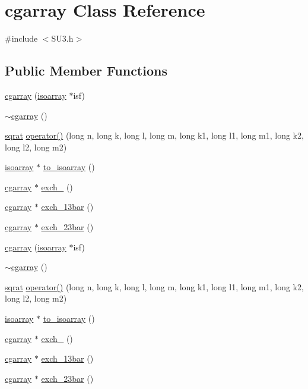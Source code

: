 \hypertarget{classcgarray}{}\section{cgarray Class Reference}
\label{classcgarray}


{\ttfamily \#include $<$S\+U3.\+h$>$}

\subsection*{Public Member Functions}
\begin{DoxyCompactItemize}
\item 
\mbox{\hyperlink{classcgarray_a0a9d804cf3256428f8d8937749a8b776}{cgarray}} (\mbox{\hyperlink{classisoarray}{isoarray}} $\ast$isf)
\item 
\mbox{\hyperlink{classcgarray_af332defc2438028410ad8e2ae98aa848}{$\sim$cgarray}} ()
\item 
\mbox{\hyperlink{classsqrat}{sqrat}} \mbox{\hyperlink{classcgarray_ad55c1e537d3070a732d9355ed351d53e}{operator()}} (long n, long k, long l, long m, long k1, long l1, long m1, long k2, long l2, long m2)
\item 
\mbox{\hyperlink{classisoarray}{isoarray}} $\ast$ \mbox{\hyperlink{classcgarray_af65861dda6c89fcaed8b73a40dfe88a6}{to\+\_\+isoarray}} ()
\item 
\mbox{\hyperlink{classcgarray}{cgarray}} $\ast$ \mbox{\hyperlink{classcgarray_a59212ed070a6ebdc199063d7c7eaee50}{exch\+\_}} ()
\item 
\mbox{\hyperlink{classcgarray}{cgarray}} $\ast$ \mbox{\hyperlink{classcgarray_a961a09e4792a1e3b9b9c7ac10f02bc1b}{exch\+\_\+13bar}} ()
\item 
\mbox{\hyperlink{classcgarray}{cgarray}} $\ast$ \mbox{\hyperlink{classcgarray_af5c8cdf36d5e417b29162ca27805fc1b}{exch\+\_\+23bar}} ()
\item 
\mbox{\hyperlink{classcgarray_a0a9d804cf3256428f8d8937749a8b776}{cgarray}} (\mbox{\hyperlink{classisoarray}{isoarray}} $\ast$isf)
\item 
\mbox{\hyperlink{classcgarray_af332defc2438028410ad8e2ae98aa848}{$\sim$cgarray}} ()
\item 
\mbox{\hyperlink{classsqrat}{sqrat}} \mbox{\hyperlink{classcgarray_ad55c1e537d3070a732d9355ed351d53e}{operator()}} (long n, long k, long l, long m, long k1, long l1, long m1, long k2, long l2, long m2)
\item 
\mbox{\hyperlink{classisoarray}{isoarray}} $\ast$ \mbox{\hyperlink{classcgarray_ade5be135cf4078de471bfb31497b0efa}{to\+\_\+isoarray}} ()
\item 
\mbox{\hyperlink{classcgarray}{cgarray}} $\ast$ \mbox{\hyperlink{classcgarray_a86ce4d7c72cddf62047e018d1199df8c}{exch\+\_}} ()
\item 
\mbox{\hyperlink{classcgarray}{cgarray}} $\ast$ \mbox{\hyperlink{classcgarray_af08670dc7c69194e4f7ace902daac0bf}{exch\+\_\+13bar}} ()
\item 
\mbox{\hyperlink{classcgarray}{cgarray}} $\ast$ \mbox{\hyperlink{classcgarray_a076528ed9996913e7017e81be6384a85}{exch\+\_\+23bar}} ()
\end{DoxyCompactItemize}


